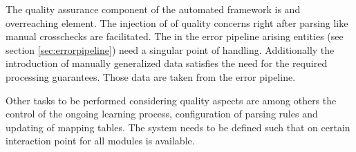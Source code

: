 The quality assurance component of the automated framework is and overreaching element. The injection of of quality concerns right after parsing like manual crosschecks are facilitated. The in the error pipeline arising entities (see section \ref{sec:errorpipeline}) need a singular point of handling. Additionally the introduction of manually generalized data satisfies the need for the required processing guarantees. Those data are taken from the error pipeline. 

Other tasks to be performed considering quality aspects are among others the control of the ongoing learning process, configuration of parsing rules and updating of mapping tables. The system needs to be defined such that on certain interaction point for all modules is available.  